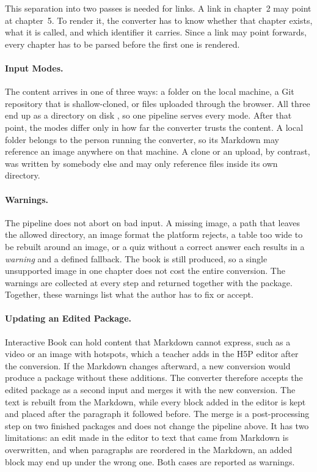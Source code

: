 This separation into two passes is needed for links.
A link in chapter~2 may point at chapter~5. To render it, the converter has to know whether that
chapter exists, what it is called, and which identifier it carries.
Since a link may point forwards, every chapter has to be parsed before the first one is rendered.

\paragraph{Input Modes.}
The content arrives in one of three ways: a folder on the local machine, a Git repository that is
shallow-cloned, or files uploaded through the browser.
All three end up as a directory on disk , so one pipeline serves every mode.
After that point, the modes differ only in how far the converter trusts the content.
A local folder belongs to the person running the converter, so its Markdown may reference an image
anywhere on that machine.
A clone or an upload, by contrast, was written by somebody else and may only reference files inside its own
directory.

\paragraph{Warnings.}
\label{sec:ov_warnings}
The pipeline does not abort on bad input.
A missing image, a path that leaves the allowed directory, an image format the platform rejects, a
table too wide to be rebuilt around an image, or a quiz without a correct answer each results in a
\emph{warning} and a defined fallback.
The book is still produced, so a single unsupported image in one chapter does not
cost the entire conversion.
The warnings are collected at every step and returned together with the package.
Together, these warnings list what the author has to fix or accept.

\paragraph{Updating an Edited Package.}
Interactive Book can hold content that Markdown cannot express, such as a video or an image with
hotspots, which a teacher adds in the H5P editor after the conversion.
If the Markdown changes afterward, a new conversion would produce a package without these
additions.
The converter therefore accepts the edited package as a second input and merges it with the new
conversion.
The text is rebuilt from the Markdown, while every block added in the editor is kept and placed after
the paragraph it followed before.
The merge is a post-processing step on two finished packages and does not change the pipeline above.
It has two limitations: an edit made in the editor to text that came from Markdown is overwritten,
and when paragraphs are reordered in the Markdown, an added block may end up under the wrong one.
Both cases are reported as warnings.
